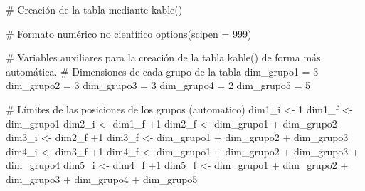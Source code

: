 \documentclass[
]{article}
\newenvironment{Shaded}{\begin{snugshade}}{\end{snugshade}}
\newcommand{\CommentTok}[1]{\textcolor[rgb]{0.50,0.62,0.50}{#1}}
\newcommand{\DataTypeTok}[1]{\textcolor[rgb]{0.87,0.87,0.75}{#1}}
\newcommand{\DecValTok}[1]{\textcolor[rgb]{0.86,0.86,0.80}{#1}}
\newcommand{\KeywordTok}[1]{\textcolor[rgb]{0.94,0.87,0.69}{#1}}
\newcommand{\NormalTok}[1]{\textcolor[rgb]{0.80,0.80,0.80}{#1}}
\newcommand{\OperatorTok}[1]{\textcolor[rgb]{0.94,0.94,0.82}{#1}}
\newcommand{\StringTok}[1]{\textcolor[rgb]{0.80,0.58,0.58}{#1}}
\begin{document}
\begin{Shaded}
\begin{Highlighting}[]
\CommentTok{# Creación de la tabla mediante kable()}

\CommentTok{# Formato numérico no científico}
\KeywordTok{options}\NormalTok{(}\DataTypeTok{scipen =} \DecValTok{999}\NormalTok{)}

\CommentTok{# Variables auxiliares para la creación de la tabla kable() de forma más automática.}
\CommentTok{# Dimensiones de cada grupo de la tabla}
\NormalTok{dim_grupo1 =}\StringTok{ }\DecValTok{3}
\NormalTok{dim_grupo2 =}\StringTok{ }\DecValTok{3}
\NormalTok{dim_grupo3 =}\StringTok{ }\DecValTok{3}
\NormalTok{dim_grupo4 =}\StringTok{ }\DecValTok{2}
\NormalTok{dim_grupo5 =}\StringTok{ }\DecValTok{5}

\CommentTok{# Límites de las posiciones de los grupos (automatico)}
\NormalTok{dim1_i <-}\StringTok{ }\DecValTok{1}
\NormalTok{dim1_f <-}\StringTok{ }\NormalTok{dim_grupo1}
\NormalTok{dim2_i <-}\StringTok{ }\NormalTok{dim1_f }\OperatorTok{+}\DecValTok{1}
\NormalTok{dim2_f <-}\StringTok{ }\NormalTok{dim_grupo1 }\OperatorTok{+}\StringTok{ }\NormalTok{dim_grupo2}
\NormalTok{dim3_i <-}\StringTok{ }\NormalTok{dim2_f }\OperatorTok{+}\DecValTok{1}
\NormalTok{dim3_f <-}\StringTok{ }\NormalTok{dim_grupo1 }\OperatorTok{+}\StringTok{ }\NormalTok{dim_grupo2 }\OperatorTok{+}\StringTok{ }\NormalTok{dim_grupo3}
\NormalTok{dim4_i <-}\StringTok{ }\NormalTok{dim3_f }\OperatorTok{+}\DecValTok{1}
\NormalTok{dim4_f <-}\StringTok{ }\NormalTok{dim_grupo1 }\OperatorTok{+}\StringTok{ }\NormalTok{dim_grupo2 }\OperatorTok{+}\StringTok{ }\NormalTok{dim_grupo3 }\OperatorTok{+}\StringTok{ }\NormalTok{dim_grupo4}
\NormalTok{dim5_i <-}\StringTok{ }\NormalTok{dim4_f }\OperatorTok{+}\DecValTok{1}
\NormalTok{dim5_f <-}\StringTok{ }\NormalTok{dim_grupo1 }\OperatorTok{+}\StringTok{ }\NormalTok{dim_grupo2 }\OperatorTok{+}\StringTok{ }\NormalTok{dim_grupo3 }\OperatorTok{+}\StringTok{ }\NormalTok{dim_grupo4 }\OperatorTok{+}\StringTok{ }\NormalTok{dim_grupo5}


\end{Highlighting}
\end{Shaded}
\end{document}
